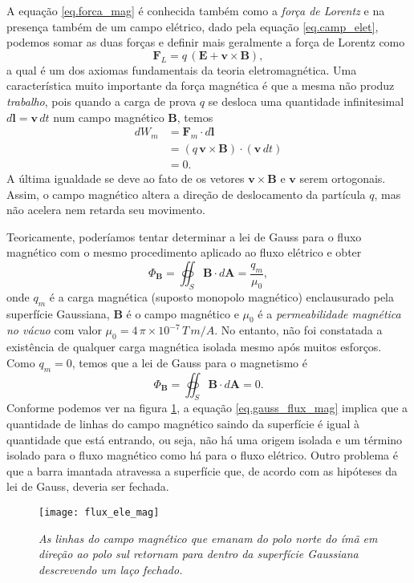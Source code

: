 A equa\c{c}\~ao \ref{eq.forca_mag} \'e conhecida tamb\'em como a \textit{for\c{c}a de Lorentz} e na presen\c{c}a tamb\'em de um campo el\'etrico, dado pela equa\c{c}\~ao \ref{eq.camp_elet}, podemos somar as duas for\c{c}as e definir mais geralmente a for\c{c}a de Lorentz como
\begin{equation}\label{eq.forca_lorentz}
\textbf{F}_L=q\,(\mathbf{E}+\textbf{v}\times\textbf{B}),
\end{equation} 
a qual \'e um dos axiomas fundamentais da teoria eletromagn\'etica. Uma caracter\'istica muito importante da for\c{c}a magn\'etica \'e que a mesma n\~ao produz \textit{trabalho}, pois quando a carga de prova $q$ se desloca uma quantidade infinitesimal $d\mathbf{l}=\mathbf{v}\,dt$ num campo magn\'etico $\mathbf{B}$, temos 
\begin{align}\label{eq.trabalho_froca_mag}\nonumber
dW_m&=\mathbf{F}_m\cdot d\mathbf{l}\\\nonumber
&=(q\,\textbf{v}\times\textbf{B})\cdot(\mathbf{v}\,dt)\\
&=0.
\end{align}
A \'ultima igualdade se deve ao fato de os vetores $\mathbf{v}\times\mathbf{B}$ e $\mathbf{v}$ serem ortogonais. Assim, o campo magn\'etico altera a dire\c{c}\~ao de deslocamento da part\'icula $q$, mas n\~ao acelera nem retarda seu movimento.

Teoricamente, poderíamos tentar determinar a lei de Gauss para o fluxo magnético com o mesmo procedimento aplicado ao fluxo elétrico e obter
\begin{equation*}
\Phi_\textbf{B}=\oiint_S\textbf{B}\cdot\textit{d}\textbf{A}=\frac{q_m}{\mu_0},
\end{equation*} 
onde $q_m$ é a carga magnética (suposto monopolo magnético) enclausurado pela superfície Gaussiana, $\mathbf{B}$ é o campo magnético e $\mu_0$ é a \textit{permeabilidade magnética no vácuo} com valor $\mu_0=4\,\pi\times 10^{-7}\, T\,m/A$. No entanto, não foi constatada a existência de qualquer carga magnética isolada mesmo após muitos esforços. Como $q_m=0$, temos que a lei de Gauss para o magnetismo é
\begin{equation}\label{eq.gauss_flux_mag}
\Phi_\textbf{B}=\oiint_S\textbf{B}\cdot\textit{d}\textbf{A}=0.
\end{equation}
Conforme podemos ver na figura \ref{fig.flux_elet_magn}, a equação \ref{eq.gauss_flux_mag} implica que a quantidade de linhas do campo magnético saindo da superfície é igual à quantidade que está entrando, ou seja, não há uma origem isolada e um término isolado para o fluxo magnético como há para o fluxo elétrico. Outro problema é que a barra imantada atravessa a superfície que, de acordo com as hipóteses da lei de Gauss, deveria ser fechada.
\begin{figure}[!htb]
\centering
\texttt{[image: flux\_ele\_mag]}
\caption{\textit{As linhas do campo magnético que emanam do polo norte do ímã em direção ao polo sul retornam para dentro da superfície Gaussiana descrevendo um laço fechado.}}
\label{fig.flux_elet_magn}
\end{figure}

